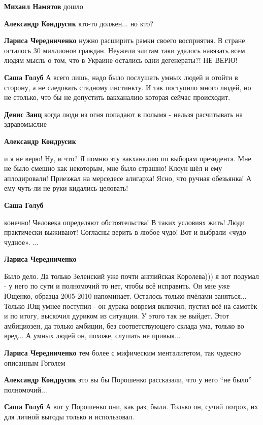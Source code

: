\begin{itemize}
\begin{itemize}
\textbf{Михаил Намятов} дошло

\textbf{Александр Кондрусик} кто-то должен... но кто?

\textbf{Лариса Чередниченко} нужно расширить рамки своего восприятия. В стране осталось 30 миллионов граждан. Неужели элитам таки удалось навязать всем людям мысль о том, что в Украине остались одни дегенераты?! НЕ ВЕРЮ!

\textbf{Саша Голуб} А всего лишь, надо было послушать умных людей и отойти в сторону, а не следовать стадному инстинкту. И так поступило много людей, но не столько, что бы не допустить вакханалию которая сейчас происходит.

\textbf{Денис Заиц} когда люди из огня попадают в полымя - нельзя расчитывать на здравомыслие

\textbf{Александр Кондрусик} 

и я не верю! Ну, и что? Я помню эту вакханалию по выборам президента. Мне не
было смешно как некоторым, мне было страшно! Клоун шёл и ему аплодировали!
Приезжал на мерседесе алигарха! Ясно, что ручная обезьянка! А ему чуть-ли не
руки кидались целовать!


\textbf{Саша Голуб} 

конечно! Человека определяют обстоятельства! В таких условиях жить! Люди
практически выживают! Согласны верить в любое чудо! Вот и выбрали «чудо
чудное». ...


\textbf{Лариса Чередниченко} 

Было дело. Да только Зеленский уже почти английская Королева))) я вот подумал -
у него по сути и полномочий то нет, чтобы всё исправить. Он мне уже Ющенко,
образца 2005-2010 напоминает. Осталось только пчёлами заняться... Только Ющ
умнее поступил - он дурака вовремя включил, пустил всё на самотёк и по итогу,
выскочил дуриком из ситуации. У этого так не выйдет. Этот амбициозен, да только
амбиции, без соответствующего склада ума, только во вред... А умных людей он,
похоже, слушать не привык...

\textbf{Лариса Чередниченко} тем более с мифическим менталитетом, так чудесно описанным Гоголем

\textbf{Александр Кондрусик} это вы бы Порошенко рассказали, что у него \enquote{не было} полномочий...

\textbf{Саша Голуб} А вот у Порошенко они, как раз, были. Только он, сучий потрох, их для личной выгоды только и использовал.


\end{itemize}
\end{itemize}
